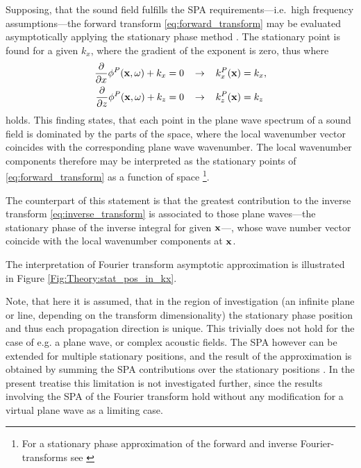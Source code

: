 Supposing, that the sound field fulfills the SPA requirements---i.e.\ high frequency assumptions---the forward transform \eqref{eq:forward_transform}
may be evaluated asymptotically applying the stationary phase method \cite{Arnold1995, Tinkelman2005}.
The stationary point is found for a given $k_x$, where the gradient of the exponent is zero, thus where
\begin{align}
\frac{\partial}{\partial x} \phi^P(\mathbf{x},\omega) + k_x &= 0 \hspace{3mm} \rightarrow \hspace{3mm} k_x^P(\mathbf{x}) = k_x, \\
\frac{\partial}{\partial z} \phi^P(\mathbf{x},\omega) + k_z &= 0 \hspace{3mm} \rightarrow \hspace{3mm} k_z^P(\mathbf{x}) = k_z
\end{align}
holds.
This finding states, that each point in the plane wave spectrum of a sound field is dominated by the parts of the space, where the local wavenumber vector coincides with the corresponding plane wave wavenumber.
The local wavenumber components therefore may be interpreted as the stationary points of \eqref{eq:forward_transform} as a function of space \footnote{For a stationary phase approximation of the forward and inverse Fourier-transforms see \cite[Eq.\ 5.20, 5.51]{Tracy2014}}.

The counterpart of this statement is that the greatest contribution to the inverse transform \eqref{eq:inverse_transform} is associated to those plane waves---the stationary phase of the inverse integral for given $\mathbf{x}$---, whose wave number vector coincide with the local wavenumber components at $\mathbf{x}$.

The interpretation of Fourier transform asymptotic approximation is illustrated in Figure \ref{Fig:Theory:stat_pos_in_kx}.

Note, that here it is assumed, that in the region of investigation (an infinite plane or line, depending on the transform dimensionality) the stationary phase position and thus each propagation direction is unique.
This trivially does not hold for the case of e.g. a plane wave, or complex acoustic fields.
The SPA however can be extended for multiple stationary positions, and the result of the approximation is obtained by summing the SPA contributions over the stationary positions \cite[p. 129]{Bleistein2000}.
In the present treatise this limitation is not investigated further, since the results involving the SPA of the Fourier transform hold without any modification for a virtual plane wave as a limiting case.

